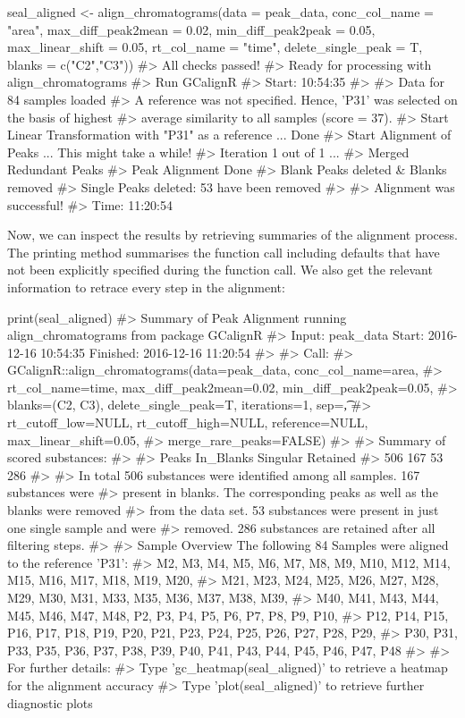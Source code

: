 \begin{example}
seal_aligned <- align_chromatograms(data = peak_data,
                    conc_col_name = "area",
                    max_diff_peak2mean = 0.02,
                    min_diff_peak2peak = 0.05,
                    max_linear_shift = 0.05,
                    rt_col_name = "time",
                    delete_single_peak = T,
                    blanks = c("C2","C3"))
#> All checks passed!
#> Ready for processing with align_chromatograms
#> Run GCalignR
#> Start: 10:54:35
#>
#> Data for 84 samples loaded
#> A reference was not specified. Hence, 'P31' was selected on the basis of highest
#> average similarity to all samples (score = 37).
#> Start Linear Transformation with "P31" as a reference ... Done
#> Start Alignment of Peaks ...  This might take a while!
#> Iteration 1 out of 1  ... 
#> Merged Redundant Peaks
#> Peak Alignment Done 
#> Blank Peaks deleted & Blanks removed
#> Single Peaks deleted: 53 have been removed
#> 
#> Alignment was successful!
#> Time: 11:20:54
\end{example}

Now, we can inspect the results by retrieving summaries of the alignment process. The printing method summarises the function call including defaults that have not been explicitly specified during the function call. We also get the relevant information to retrace every step in the alignment:
\begin{example}
print(seal_aligned)
#>  Summary of Peak Alignment running align_chromatograms from package GCalignR
#>  Input: peak_data	Start:  2016-12-16 10:54:35 	Finished:  2016-12-16 11:20:54 
#>
#> Call:
#>  GCalignR::align_chromatograms(data=peak_data, conc_col_name=area,
#>  rt_col_name=time, max_diff_peak2mean=0.02, min_diff_peak2peak=0.05,
#>  blanks=(C2, C3), delete_single_peak=T, iterations=1, sep=\t,
#>  rt_cutoff_low=NULL, rt_cutoff_high=NULL, reference=NULL, max_linear_shift=0.05,
#>  merge_rare_peaks=FALSE)
#>
#> Summary of scored substances:
#>
#>   Peaks In_Blanks  Singular  Retained 
#>      506       167        53       286 
#>
#>  In total 506 substances were identified among all samples. 167 substances were
#>  present in blanks. The corresponding peaks as well as the blanks were removed
#>  from the data set. 53 substances were present in just one single sample and were
#>  removed. 286 substances are retained after all filtering steps.
#>
#> Sample Overview  The following 84 Samples were aligned to the reference 'P31':
#>  M2, M3, M4, M5, M6, M7, M8, M9, M10, M12, M14, M15, M16, M17, M18, M19, M20,
#>  M21, M23, M24, M25, M26, M27, M28, M29, M30, M31, M33, M35, M36, M37, M38, M39,
#>  M40, M41, M43, M44, M45, M46, M47, M48, P2, P3, P4, P5, P6, P7, P8, P9, P10,
#>  P12, P14, P15, P16, P17, P18, P19, P20, P21, P23, P24, P25, P26, P27, P28, P29,
#>  P30, P31, P33, P35, P36, P37, P38, P39, P40, P41, P43, P44, P45, P46, P47, P48
#>
#> For further details:
#>  Type 'gc_heatmap(seal_aligned)' to retrieve a heatmap for the alignment accuracy
#>  Type 'plot(seal_aligned)' to retrieve further diagnostic plots
\end{example}

